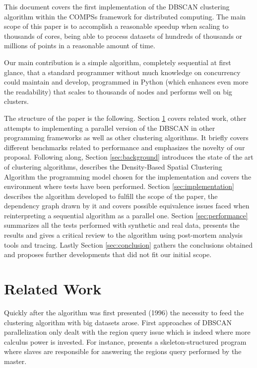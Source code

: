 \documentclass[10pt,journal,compsoc]{IEEEtran}
\begin{document}
This document covers the first implementation of the DBSCAN clustering algorithm within the COMPSs \cite{compss} framework for distributed computing. The main scope of this paper is to accomplish a reasonable speedup when scaling to thousands of cores, being able to process datasets of hundreds of thousands or millions of points in a reasonable amount of time.

Our main contribution is a simple algorithm, completely sequential at first glance, that a standard programmer without much knowledge on concurrency could maintain and develop, programmed in Python (which enhances even more the readability) that scales to thousands of nodes and performs well on big clusters. 

The structure of the paper is the following. Section \ref{sec:related_work} covers related work, other attempts to implementing a parallel version of the DBSCAN in other programming frameworks as well as other clustering algorithms. It briefly covers different benchmarks related to performance and emphasizes the novelty of our proposal. Following along, Section \ref{sec:background} introduces the state of the art of clustering algorithms, describes the Density-Based Spatial Clustering Algorithm the programming model chosen for the implementation and covers the environment where tests have been performed. Section \ref{sec:implementation} describes the algorithm developed to fulfill the scope of the paper, the dependency graph drawn by it and covers possible equivalence issues faced when reinterpreting a sequential algorithm as a parallel one. Section \ref{sec:performance} summarizes all the tests performed with synthetic and real data, presents the results and gives a critical review to the algorithm using post-mortem analysis tools and tracing. Lastly Section \ref{sec:conclusion} gathers the conclusions obtained and proposes further developments that did not fit our initial scope.

\section{Related Work} \label{sec:related_work}

Quickly after the algorithm was first presented (1996) the necessity to feed the clustering algorithm with big datasets arose. First approaches of DBSCAN parallelization only dealt with the region query issue which is indeed where more calculus power is invested. For instance, \cite{related_1} presents a skeleton-structured program where slaves are responsible for answering the regions query performed by the master.
\end{document}

